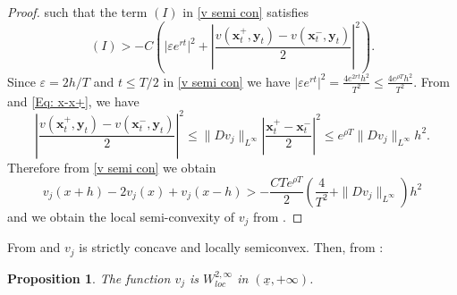 \documentclass[11pt]{article}
\numberwithin{equation}{section}
\newtheorem{prop}[thm]{Proposition}
\theoremstyle{definition}
\newcommand{\eps}{\varepsilon}
\newcommand{\ux}{{\underline x}}
\newcommand{\lc}{\left(}
\newcommand{\rc}{\right)}
\theoremstyle{plain}
\begin{document}
\begin{proof}
{%
such that the term  $(I)$ in \eqref{v semi con} satisfies 
$$
(I)>-C\lc \vert \eps e^{rt}\vert^2+\left\vert \frac{v\lc \boldsymbol{x}^+_t,\boldsymbol{y}_t\rc-v\lc \boldsymbol{x}^-_t,\boldsymbol{y}_t\rc}{2}\right\vert^2\rc.
$$
Since $\eps=2h/T$ and $t\leq T/2$ in \cref{v semi con} we have $\vert \eps e^{rt}\vert^2=\frac{4e^{2rt}h^2}{T^2}\leq \frac{4e^{\rho T}h^2}{T^2}$. 
From  and \cref{Eq: x-x+}, we have 
$$
\left\vert \frac{v\lc \boldsymbol{x}^+_t,\boldsymbol{y}_t\rc-v\lc \boldsymbol{x}^-_t,\boldsymbol{y}_t\rc}{2}\right\vert^2\leq \|Dv_j\|_{L^\infty}\left\vert \frac{\boldsymbol{x}^+_t-\boldsymbol{x}^-_t}{2}\right\vert^2\leq e^{\rho T}\|Dv_j\|_{L^\infty}h^2.
$$
 Therefore from \eqref{v semi con} we obtain 
 $$
v_j(x+h)-2v_j(x)+v_j(x-h)>-\frac{CTe^{\rho T}}{2}\lc \frac{4}{T^2}+\|Dv_j\|_{L^\infty}\rc h^2
 $$
 }
 and we obtain the local semi-convexity of $v_j$ from . 
\end{proof}
 From  and  $v_j$ is strictly concave and locally semiconvex. Then, from \cite[Lemma 10.7]{fleming2006controlled}:
\begin{prop}\label{Prop:v W2}
The function $v_j$ is $W^{2,\infty}_{loc}$ in $(\ux,+\infty)$. 
\end{prop}
\end{document}
